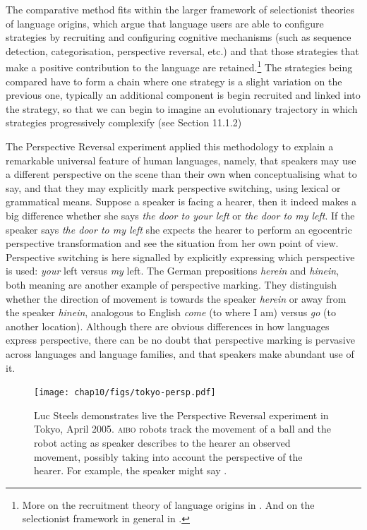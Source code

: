 The comparative method fits within the larger framework of selectionist theories  
of language origins, which argue that language users are able to configure strategies by recruiting and configuring 
cognitive mechanisms (such as sequence detection, categorisation, perspective reversal, etc.) and that those 
strategies that make a positive contribution to the language are retained.\footnote{
More on the recruitment theory of language origins in \cite{Steels:2007recruitment}. 
And on the selectionist framework in general in \cite{Steels:2012}.}
The strategies being compared have to form a chain where one strategy is a slight variation on the previous one, typically 
an additional component is begin recruited and linked into the strategy, so that we can begin to imagine an 
evolutionary trajectory in which strategies progressively complexify (see Section 11.1.2)

The Perspective Reversal experiment applied this methodology to explain a remarkable universal feature 
of human languages, namely, 
that speakers may use a different perspective on the scene than their own when 
conceptualising what to say, and that they may explicitly mark perspective switching, using lexical or grammatical means. Suppose
a speaker is facing a hearer, then it indeed makes a big difference whether she says 
\emph{the door to your left}  or \emph{the door to my left}. If the speaker says
\emph{the door to my left} she expects the hearer to perform an egocentric
perspective transformation and see the situation from her own point of view. Perspective switching is here signalled by 
explicitly expressing which perspective is used: {\itshape your} left versus {\itshape my} left. 
The German prepositions \emph{herein} and \emph{hinein}, both meaning  are another example of perspective marking. They
distinguish whether the direction of movement is 
towards the speaker \emph{herein} or away from the speaker \emph{hinein}, analogous to English \emph{come} (to where I am) 
versus \emph{go} (to another location). Although there are obvious differences in how languages express
perspective, there can be no doubt that perspective marking is pervasive across 
languages and language families, and that speakers make abundant use of it. 

\begin{figure}[htbp]
  \centerline{\texttt{[image: chap10/figs/tokyo-persp.pdf]}}
\caption{\label{fig:tokyo-persp}Luc Steels demonstrates live the Perspective Reversal experiment in Tokyo, April 2005. \textsc{aibo} robots track 
the movement of a ball and 
the robot acting as speaker describes to the hearer an observed movement, possibly taking into account the 
perspective of the hearer. For example, the speaker might say .}
\end{figure}


